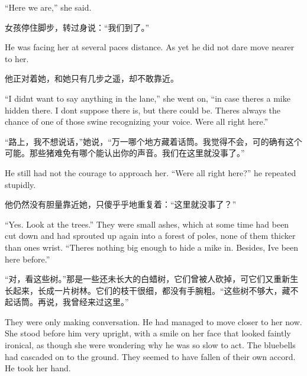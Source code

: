 \begin{paracol}{2}
\switchcolumn*

``Here we are,'' she said.

\switchcolumn

女孩停住脚步，转过身说：``我们到了。''

\switchcolumn*

He was facing her at several paces\textquotesingle{} distance. As yet he
did not dare move nearer to her.

\switchcolumn

他正对着她，和她只有几步之遥，却不敢靠近。

\switchcolumn*

``I didn\textquotesingle t want to say anything in the lane,'' she went
on, ``in case there\textquotesingle s a mike hidden there. I
don\textquotesingle t suppose there is, but there could be.
There\textquotesingle s always the chance of one of those swine
recognizing your voice. We\textquotesingle re all right here.''

\switchcolumn

``路上，我不想说话，''她说，``万一哪个地方藏着话筒。我觉得不会，可的确有这个可能。那些猪难免有哪个能认出你的声音。我们在这里就没事了。''

\switchcolumn*

He still had not the courage to approach her. ``We\textquotesingle re all
right here?'' he repeated stupidly.

\switchcolumn

他仍然没有胆量靠近她，只傻乎乎地重复着：``这里就没事了？''

\switchcolumn*

``Yes. Look at the trees.'' They were small ashes, which at some time had
been cut down and had sprouted up again into a forest of poles, none of
them thicker than one\textquotesingle s wrist. ``There\textquotesingle s
nothing big enough to hide a mike in. Besides, I\textquotesingle ve been
here before.''

\switchcolumn

``对，看这些树。''那是一些还未长大的白蜡树，它们曾被人砍掉，可它们又重新生长起来，长成一片树林。它们的枝干很细，都没有手腕粗。``这些树不够大，藏不起话筒。再说，我曾经来过这里。''

\switchcolumn*

They were only making conversation. He had managed to move closer to her
now. She stood before him very upright, with a smile on her face that
looked faintly ironical, as though she were wondering why he was so slow
to act. The bluebells had cascaded on to the ground. They seemed to have
fallen of their own accord. He took her hand.


\end{paracol}
